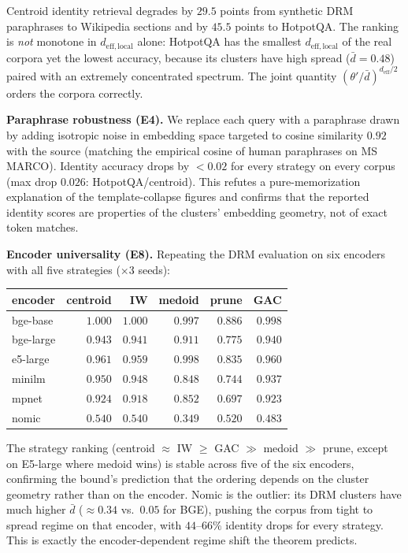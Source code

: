 \documentclass[11pt]{article}
\theoremstyle{definition}
\theoremstyle{remark}
\newcommand{\deff}{d_{\mathrm{eff}}}
\newcommand{\dbar}{\bar{d}}
\newcommand{\thetap}{\theta'}
\begin{document}
Centroid identity retrieval degrades by $29.5$ points from synthetic
DRM paraphrases to Wikipedia sections and by $45.5$ points to HotpotQA.
The ranking is \emph{not} monotone in $d_{\mathrm{eff,local}}$ alone:
HotpotQA has the smallest $d_{\mathrm{eff,local}}$ of the real corpora
yet the lowest accuracy, because its clusters have high spread
($\dbar=0.48$) paired with an extremely concentrated spectrum. The
joint quantity $(\thetap/\dbar)^{\deff/2}$ orders the corpora correctly.

\textbf{Paraphrase robustness (E4).} We replace each query with a
paraphrase drawn by adding isotropic noise in embedding space targeted
to cosine similarity $0.92$ with the source (matching the empirical
cosine of human paraphrases on MS MARCO). Identity accuracy drops by
$<0.02$ for every strategy on every corpus
(max drop $0.026$: HotpotQA/centroid). This refutes a pure-memorization
explanation of the template-collapse figures and confirms that the
reported identity scores are properties of the clusters' embedding
geometry, not of exact token matches.

\textbf{Encoder universality (E8).} Repeating the DRM evaluation on
six encoders with all five strategies ($\times 3$ seeds):
\begin{center}
\begin{tabular}{lrrrrr}
\toprule
encoder & centroid & IW & medoid & prune & GAC \\
\midrule
bge-base  & $1.000$ & $1.000$ & $0.997$ & $0.886$ & $0.998$ \\
bge-large & $0.943$ & $0.941$ & $0.911$ & $0.775$ & $0.940$ \\
e5-large  & $0.961$ & $0.959$ & $0.998$ & $0.835$ & $0.960$ \\
minilm    & $0.950$ & $0.948$ & $0.848$ & $0.744$ & $0.937$ \\
mpnet     & $0.924$ & $0.918$ & $0.852$ & $0.697$ & $0.923$ \\
nomic     & $0.540$ & $0.540$ & $0.349$ & $0.520$ & $0.483$ \\
\bottomrule
\end{tabular}
\end{center}
The strategy ranking (centroid $\approx$ IW $\geq$ GAC $\gg$ medoid $\gg$
prune, except on E5-large where medoid wins) is stable across
five of the six encoders, confirming the bound's prediction that the
ordering depends on the cluster geometry rather than on the encoder.
Nomic is the outlier: its DRM clusters have much higher $\dbar$
($\approx 0.34$ vs.\ $0.05$ for BGE), pushing the corpus from tight to
spread regime on that encoder, with $44$--$66\%$ identity drops for
every strategy. This is exactly the encoder-dependent regime shift the
theorem predicts.
\end{document}

